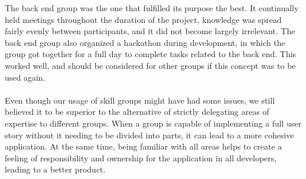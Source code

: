 The back end group was the one that fulfilled its purpose the best.
It continually held meetings throughout the duration of the project, knowledge was spread fairly evenly between participants, and it did not become largely irrelevant.
The back end group also organized a hackathon during development, in which the group got together for a full day to complete tasks related to the back end.
This worked well, and should be considered for other groups if this concept was to be used again.
\\\\
Even though our usage of skill groups might have had some issues, we still believed it to be superior to the alternative of strictly delegating areas of expertise to different groups.
When a group is capable of implementing a full user story without it needing to be divided into parts, it can lead to a more cohesive application.
At the same time, being familiar with all areas helps to create a feeling of responsibility and ownership for the application in all developers, leading to a better product.
